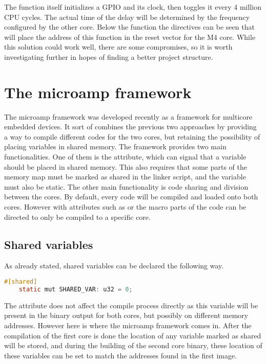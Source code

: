 The function itself initializes a GPIO and its clock, then toggles it every 4 million CPU cycles. The actual time of the delay will be determined by the frequency configured by the other core. Below the function the directives can be seen that will place the address of this function in the reset vector for the M4 core. While this solution could work well, there are some compromises, so it is worth investigating further in hopes of finding a better project structure.

\section{The microamp framework}

The microamp framework was developed recently as a framework for multicore embedded devices. It sort of combines the previous two approaches by providing a way to compile different codes for the two cores, but retaining the possibility of placing variables in shared memory. The framework provides two main functionalities. One of them is the \mycode{#[shared]} attribute, which can signal that a variable should be placed in shared memory. This also requires that some parts of the memory map must be marked as shared in the linker script, and the variable must also be static. The other main functionality is code sharing and division between the cores. By default, every code will be compiled and loaded onto both cores. However with attributes such as \mycode{#[cfg(core = "0")]} or the  macro parts of the code can be directed to only be compiled to a specific core.

\subsection{Shared variables}

As already stated, shared variables can be declared the following way.

\begin{lstlisting}[language=C,frame=single,float=!ht,label={lst:shared-variable},caption={Shared Variable Example}]
    #[shared]
    static mut SHARED_VAR: u32 = 0;
\end{lstlisting}

The attribute does not affect the compile process directly as this variable will be present in the binary output for both cores, but possibly on different memory addresses. However here is where the microamp framework comes in. After the compilation of the first core is done the location of any variable marked as shared will be stored, and during the building of the second core binary, these location of these variables can be set to match the addresses found in the first image.

